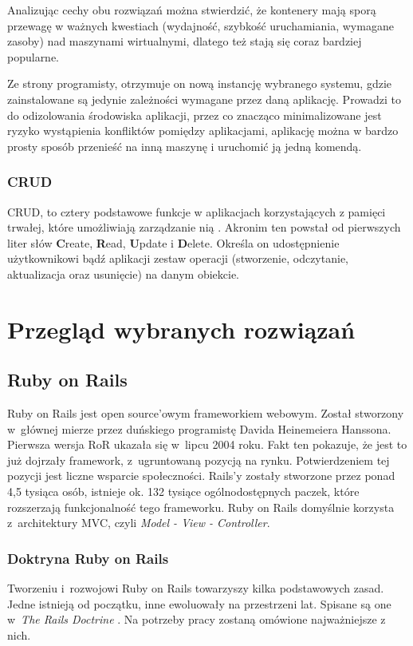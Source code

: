 \documentclass[mgr,oneside]{mgr}
\begin{document}
Analizując cechy obu rozwiązań można stwierdzić, że kontenery mają sporą przewagę w ważnych kwestiach (wydajność, szybkość uruchamiania, wymagane zasoby) nad maszynami wirtualnymi, dlatego też stają się coraz bardziej popularne.

Ze strony programisty, otrzymuje on nową instancję wybranego systemu, gdzie zainstalowane są jedynie zależności wymagane przez daną aplikację. Prowadzi to do odizolowania środowiska aplikacji, przez co znacząco minimalizowane jest ryzyko wystąpienia konfliktów pomiędzy aplikacjami, aplikację można w bardzo prosty sposób przenieść na inną maszynę i uruchomić ją jedną komendą.

\subsection{CRUD}
CRUD, to cztery podstawowe funkcje w aplikacjach korzystających z pamięci trwałej, które umożliwiają zarządzanie nią \cite{wiki_crud}. Akronim ten powstał od pierwszych liter słów \textbf{C}reate, \textbf{R}ead, \textbf{U}pdate i \textbf{D}elete. Określa on udostępnienie użytkownikowi bądź aplikacji zestaw operacji (stworzenie, odczytanie, aktualizacja oraz usunięcie) na danym obiekcie.

\chapter{Przegląd wybranych rozwiązań}
\section{Ruby on Rails}
Ruby on Rails jest open source'owym frameworkiem webowym. Został stworzony w~głównej mierze przez duńskiego programistę Davida Heinemeiera Hanssona. Pierwsza wersja RoR ukazała się w~lipcu 2004 roku. Fakt ten pokazuje, że jest to już dojrzały framework, z~ugruntowaną pozycją na rynku. Potwierdzeniem tej pozycji jest liczne wsparcie społeczności. Rails'y zostały stworzone przez ponad 4,5 tysiąca osób, istnieje ok. 132 tysiące ogólnodostępnych paczek, które rozszerzają funkcjonalność tego frameworku. Ruby on Rails domyślnie korzysta z~architektury MVC, czyli \emph{Model - View - Controller}.

\subsection{Doktryna Ruby on Rails}
Tworzeniu i~rozwojowi Ruby on Rails towarzyszy kilka podstawowych zasad. Jedne istnieją od początku, inne ewoluowały na przestrzeni lat. Spisane są one w~\emph{The Rails Doctrine} \cite{rails_doctrine}. Na potrzeby pracy zostaną omówione najważniejsze z nich.
\end{document}
